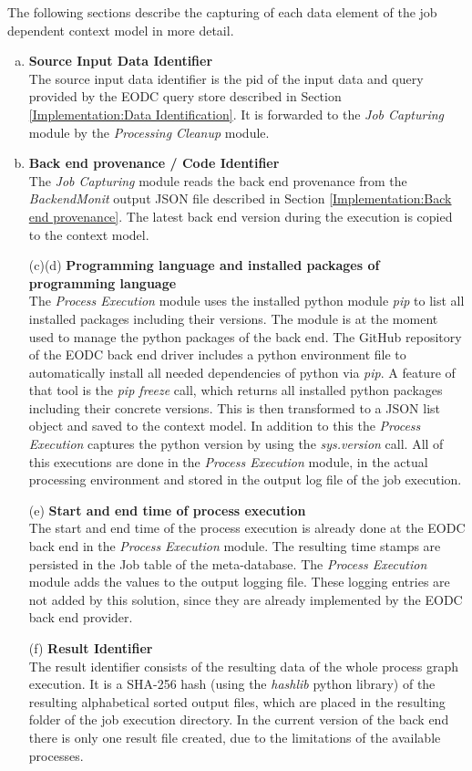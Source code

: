 \documentclass[draft,final]{vutinfth} %
\begin{document}
The following sections describe the capturing of each data element of the job dependent context model in more detail.
\begin{enumerate}[(a)]
\item \textbf{Source Input Data Identifier} \\
	The source input data identifier is the pid of the input data and query provided by the EODC query store described in Section \ref{Implementation:Data Identification}. It is forwarded to the \textit{Job Capturing} module by the \textit{Processing Cleanup} module. 

\item \textbf{Back end provenance / Code Identifier} \\
	The \textit{Job Capturing} module reads the back end provenance from the \textit{BackendMonit} output JSON file described in Section \ref{Implementation:Back end provenance}. The latest back end version during the execution is copied to the context model.

\item[(c)(d)] \textbf{Programming language and  installed packages of programming language} \\
	The \textit{Process Execution} module uses the installed python module \textit{pip} to list all installed packages including their versions. The module is at the moment used to manage the python packages of the back end. The GitHub repository of the EODC back end driver includes a python environment file to automatically install all needed dependencies of python via \textit{pip}. A feature of that tool is the \textit{pip freeze} call, which returns all installed python packages including their concrete versions. This is then transformed to a JSON list object and saved to the context model. In addition to this the \textit{Process Execution} captures the python version by using the \textit{sys.version} call. All of this executions are done in the \textit{Process Execution} module, in the actual processing environment and stored in the output log file of the job execution.    

\item[(e)] \textbf{Start and end time of process execution} \\
	The start and end time of the process execution is already done at the EODC back end in the  \textit{Process Execution} module. The resulting time stamps are persisted in the Job table of the meta-database. The \textit{Process Execution} module adds the values to the output logging file. These logging entries are not added by this solution, since they are already implemented by the EODC back end provider.  

\item[(f)] \textbf{Result Identifier} \\
	The result identifier consists of the resulting data of the whole process graph execution. It is a SHA-256 hash (using the \textit{hashlib} python library) of the resulting alphabetical sorted output files, which are placed in the resulting folder of the job execution directory. In the current version of the back end there is only one result file created, due to the limitations of the available processes.  
\end{enumerate}
\end{document}

